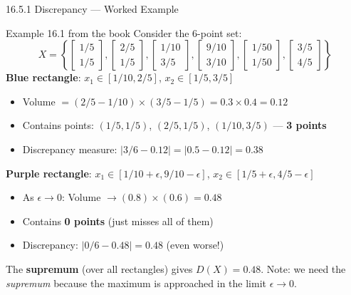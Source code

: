\documentclass[aspectratio=169,10pt]{beamer}
\begin{document}
\begin{frame}[allowframebreaks]{16.5.1 Discrepancy --- Worked Example}
  \begin{exampleblock}{Example 16.1 from the book}
    Consider the 6-point set:
    \[
      X = \left\{
        \begin{bmatrix}1/5\\1/5\end{bmatrix},
        \begin{bmatrix}2/5\\1/5\end{bmatrix},
        \begin{bmatrix}1/10\\3/5\end{bmatrix},
        \begin{bmatrix}9/10\\3/10\end{bmatrix},
        \begin{bmatrix}1/50\\1/50\end{bmatrix},
        \begin{bmatrix}3/5\\4/5\end{bmatrix}
      \right\}
    \]
    \textbf{Blue rectangle}: $x_1 \in [1/10, 2/5]$, $x_2 \in [1/5, 3/5]$
    \begin{itemize}
      \item Volume $= (2/5-1/10)\times(3/5-1/5) = 0.3\times 0.4 = 0.12$
      \item Contains points: $(1/5,1/5)$, $(2/5,1/5)$, $(1/10,3/5)$ --- \textbf{3 points}
      \item Discrepancy measure: $|3/6 - 0.12| = |0.5 - 0.12| = \mathbf{0.38}$
    \end{itemize}

    \textbf{Purple rectangle}: $x_1 \in [1/10+\epsilon, 9/10-\epsilon]$,
    $x_2 \in [1/5+\epsilon, 4/5-\epsilon]$
    \begin{itemize}
      \item As $\epsilon \to 0$: Volume $\to (0.8)\times(0.6) = 0.48$
      \item Contains \textbf{0 points} (just misses all of them)
      \item Discrepancy: $|0/6 - 0.48| = \mathbf{0.48}$ (even worse!)
    \end{itemize}

    The \textbf{supremum} (over all rectangles) gives $D(X) = 0.48$.
    Note: we need the \emph{supremum} because the maximum is approached
    in the limit $\epsilon \to 0$.
  \end{exampleblock}


\end{frame}
\end{document}
